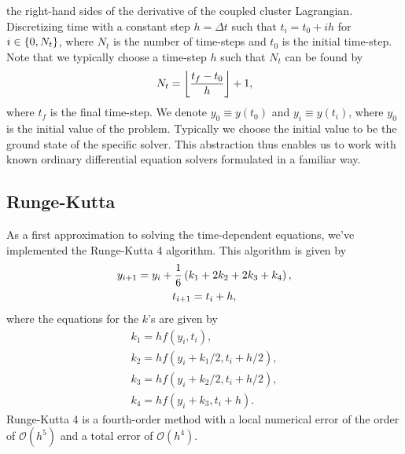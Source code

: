             the right-hand sides of the derivative of the coupled cluster
            Lagrangian.
            Discretizing time with a constant step $h = \Delta t$ such that $t_i
            = t_0 + i h$ for $i \in \left\{ 0, N_t \right\}$, where $N_t$ is the number of
            time-steps and $t_0$ is the initial time-step.
            Note that we typically choose a time-step $h$ such that $N_t$ can be
            found by
            \begin{align}
                N_t = \left\lfloor \frac{t_f - t_0}{h} \right\rfloor + 1,
            \end{align}
            where $t_f$ is the final time-step.
            We denote $y_0 \equiv y(t_0)$ and $y_i \equiv y(t_i)$, where $y_0$
            is the initial value of the problem.
            Typically we choose the initial value to be the ground state of the
            specific solver.
            This abstraction thus enables us to work with known ordinary
            differential equation solvers formulated in a familiar way.

        \subsection{Runge-Kutta}
            As a first approximation to solving the time-dependent equations,
            we've implemented the Runge-Kutta 4 algorithm.
            This algorithm is given by \cite{wiki:rk4}
            \begin{gather}
                y_{i + 1} = y_i + \frac{1}{6}\left( 
                    k_1 + 2 k_2 + 2 k_3 + k_4
                 \right), \\
                t_{i + 1} = t_i + h,
            \end{gather}
            where the equations for the $k$'s are given by
            \begin{gather}
                k_1 = h f(y_i, t_i), \\
                k_2 = h f(y_i + k_1 / 2, t_i + h / 2), \\
                k_3 = h f(y_i + k_2 / 2, t_i + h / 2), \\
                k_4 = h f(y_i + k_3, t_i + h).
            \end{gather}
            Runge-Kutta 4 is a fourth-order method with a local numerical error
            of the order of $\mathcal{O}(h^5)$ and a total error of
            $\mathcal{O}(h^4)$.

